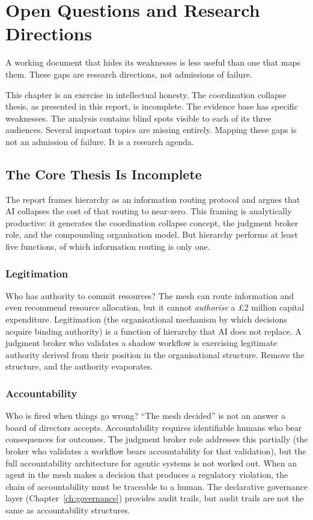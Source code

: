 \chapter{Open Questions and Research Directions}
\label{ch:open-questions}

\epigraph{A working document that hides its weaknesses is less useful than one that maps them. These gaps are research directions, not admissions of failure.}{}

This chapter is an exercise in intellectual honesty. The coordination collapse thesis, as presented in this report, is incomplete. The evidence base has specific weaknesses. The analysis contains blind spots visible to each of its three audiences. Several important topics are missing entirely. Mapping these gaps is not an admission of failure. It is a research agenda.

\section{The Core Thesis Is Incomplete}

The report frames hierarchy as an information routing protocol and argues that AI collapses the cost of that routing to near-zero. This framing is analytically productive: it generates the coordination collapse concept, the judgment broker role, and the compounding organisation model. But hierarchy performs at least five functions, of which information routing is only one.

\subsection{Legitimation}

Who has authority to commit resources? The mesh can route information and even recommend resource allocation, but it cannot \emph{authorise} a \pounds 2 million capital expenditure. Legitimation (the organisational mechanism by which decisions acquire binding authority) is a function of hierarchy that AI does not replace. A judgment broker who validates a shadow workflow is exercising legitimate authority derived from their position in the organisational structure. Remove the structure, and the authority evaporates.

\subsection{Accountability}

Who is fired when things go wrong? ``The mesh decided'' is not an answer a board of directors accepts. Accountability requires identifiable humans who bear consequences for outcomes. The judgment broker role addresses this partially (the broker who validates a workflow bears accountability for that validation), but the full accountability architecture for agentic systems is not worked out. When an agent in the mesh makes a decision that produces a regulatory violation, the chain of accountability must be traceable to a human. The declarative governance layer (Chapter~\ref{ch:governance}) provides audit trails, but audit trails are not the same as accountability structures.

